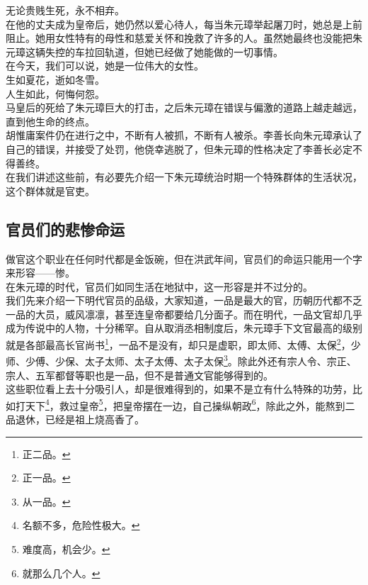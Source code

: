 \begin{multicols}{\theparacolNo}
无论贵贱生死，永不相弃。\\

在他的丈夫成为皇帝后，她仍然以爱心待人，每当朱元璋举起屠刀时，她总是上前阻止。她用女性特有的母性和慈爱关怀和挽救了许多的人。虽然她最终也没能把朱元璋这辆失控的车拉回轨道，但她已经做了她能做的一切事情。\\

在今天，我们可以说，她是一位伟大的女性。\\

生如夏花，逝如冬雪。\\

人生如此，何悔何怨。\\

马皇后的死给了朱元璋巨大的打击，之后朱元璋在错误与偏激的道路上越走越远，直到他生命的终点。\\

胡惟庸案件仍在进行之中，不断有人被抓，不断有人被杀。李善长向朱元璋承认了自己的错误，并接受了处罚，他侥幸逃脱了，但朱元璋的性格决定了李善长必定不得善终。\\

在我们讲述这些前，有必要先介绍一下朱元璋统治时期一个特殊群体的生活状况，这个群体就是官吏。\\

\subsection{官员们的悲惨命运}
做官这个职业在任何时代都是金饭碗，但在洪武年间，官员们的命运只能用一个字来形容——惨。\\

在朱元璋的时代，官员们如同生活在地狱中，这一形容是并不过分的。\\

我们先来介绍一下明代官员的品级，大家知道，一品是最大的官，历朝历代都不乏一品的大员，威风凛凛，甚至连皇帝都要给几分面子。而在明代，一品文官却几乎成为传说中的人物，十分稀罕。自从取消丞相制度后，朱元璋手下文官最高的级别就是各部最高长官尚书\footnote{正二品。}，一品不是没有，却只是虚职，即太师、太傅、太保\footnote{正一品。}，少师、少傅、少保、太子太师、太子太傅、太子太保\footnote{从一品。}。除此外还有宗人令、宗正、宗人、五军都督等职也是一品，但不是普通文官能够得到的。\\

这些职位看上去十分吸引人，却是很难得到的，如果不是立有什么特殊的功劳，比如打天下\footnote{名额不多，危险性极大。}，救过皇帝\footnote{难度高，机会少。}，把皇帝摆在一边，自己操纵朝政\footnote{就那么几个人。}，除此之外，能熬到二品退休，已经是祖上烧高香了。\\


\end{multicols}
